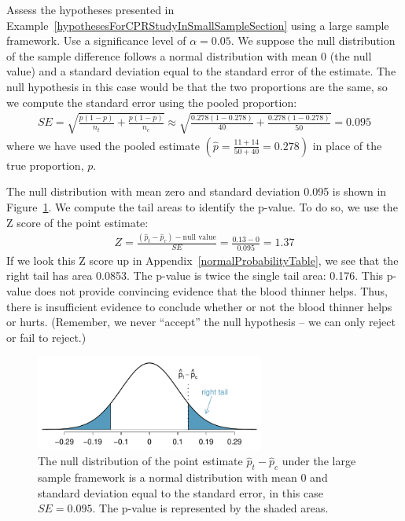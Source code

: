 \begin{example}{Assess the hypotheses presented in Example~\ref{hypothesesForCPRStudyInSmallSampleSection} using a large sample framework. Use a significance level of $\alpha=0.05$.}
We suppose the null distribution of the sample difference follows a normal distribution with mean 0 (the null value) and a standard deviation equal to the standard error of the estimate. The null hypothesis in this case would be that the two proportions are the same, so we compute the standard error using the pooled proportion:
\begin{align*}
SE = \sqrt{\frac{p(1-p)}{n_t} + \frac{p(1-p)}{n_c}}
	\approx \sqrt{\frac{0.278(1-0.278)}{40} + \frac{0.278(1-0.278)}{50}} = 0.095
\end{align*}
where we have used the pooled estimate $\left( \hat{p} = \frac{11+14}{50 + 40} = 0.278 \right)$ in place of the true proportion, $p$.

The null distribution with mean zero and standard deviation 0.095 is shown in Figure~\ref{pValueCPRStudyLargeSampleAnalysisInSmallSampleSection}. We compute the tail areas to identify the p-value. To do so, we use the Z score of the point estimate:
\begin{align*}
Z = \frac{(\hat{p}_t - \hat{p}_c) - \text{null value}}{SE} = \frac{0.13 - 0}{0.095} = 1.37
\end{align*}
If we look this Z score up in Appendix~\ref{normalProbabilityTable}, we see that the right tail has area 0.0853. The p-value is twice the single tail area: 0.176. This p-value does not provide convincing evidence that the blood thinner helps. Thus, there is insufficient evidence to conclude whether or not the blood thinner helps or hurts. (Remember, we never ``accept'' the null hypothesis -- we can only reject or fail to reject.)
\end{example}
\begin{figure}[ht]
\centering
\includegraphics[width=0.67\textwidth]{ch_inference_for_props/figures/pValueCPRStudyLargeSampleAnalysisInSmallSampleSection/pValueCPRStudyLargeSampleAnalysisInSmallSampleSection}
\caption{The null distribution of the point estimate $\hat{p}_t - \hat{p}_c$ under the large sample framework is a normal distribution with mean $0$ and standard deviation equal to the standard error, in this case $SE=0.095$. The p-value is represented by the shaded areas.}
\label{pValueCPRStudyLargeSampleAnalysisInSmallSampleSection}
\end{figure}

